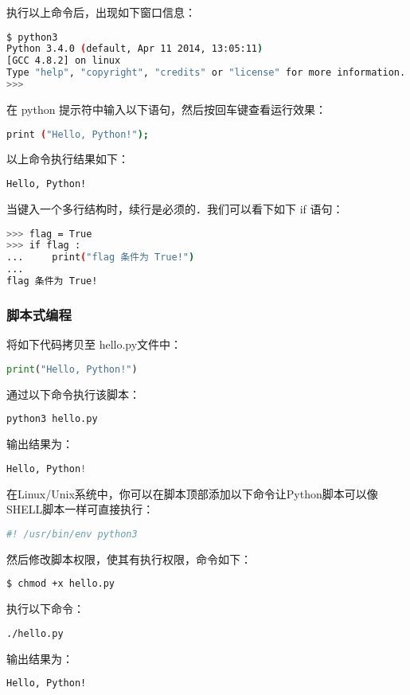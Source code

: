 执行以上命令后，出现如下窗口信息：

\begin{lstlisting}[language=bash]
$ python3
Python 3.4.0 (default, Apr 11 2014, 13:05:11) 
[GCC 4.8.2] on linux
Type "help", "copyright", "credits" or "license" for more information.
>>> 
\end{lstlisting}

在 python 提示符中输入以下语句，然后按回车键查看运行效果：

\begin{lstlisting}[language=bash]
print ("Hello, Python!");
\end{lstlisting}

以上命令执行结果如下：

\begin{lstlisting}[language=bash]
Hello, Python!
\end{lstlisting}

当键入一个多行结构时，续行是必须的．我们可以看下如下 if 语句：

\begin{lstlisting}[language=bash]
>>> flag = True
>>> if flag :
...     print("flag 条件为 True!")
... 
flag 条件为 True!
\end{lstlisting}

\subsubsection{脚本式编程}

将如下代码拷贝至 hello.py文件中：

\begin{lstlisting}[language=python]
print("Hello, Python!")
\end{lstlisting}

通过以下命令执行该脚本：

\begin{lstlisting}[language=bash]
python3 hello.py
\end{lstlisting}

输出结果为：

\begin{lstlisting}[language=python]
Hello, Python!
\end{lstlisting}

在Linux/Unix系统中，你可以在脚本顶部添加以下命令让Python脚本可以像SHELL脚本一样可直接执行：

\begin{lstlisting}[language=python]
#! /usr/bin/env python3
\end{lstlisting}

然后修改脚本权限，使其有执行权限，命令如下：

\begin{lstlisting}[language=bash]
$ chmod +x hello.py
\end{lstlisting}

执行以下命令：

\begin{lstlisting}[language=bash]
./hello.py
\end{lstlisting}

输出结果为：

\begin{lstlisting}[language=bash]
Hello, Python!
\end{lstlisting}
